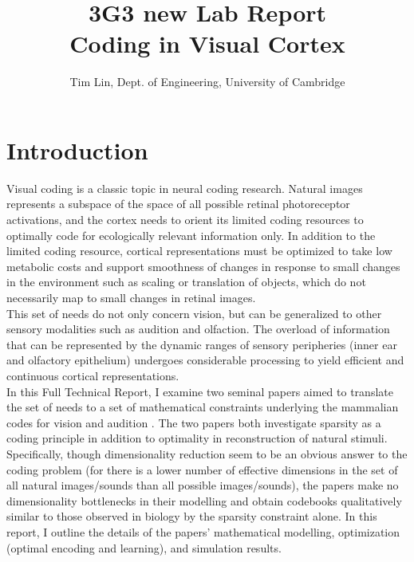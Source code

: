 \documentclass[
	a4paper, %
	11pt, %
	unnumberedsections, %
]{LTJournalArticle}
\title{3G3 new Lab Report\\Coding in Visual Cortex} %
\author{%
Tim Lin, Dept. of Engineering, University of Cambridge
}
\begin{document}
\maketitle %

\section{Introduction}
Visual coding is a classic topic in neural coding research. Natural images represents a subspace of the space of all possible retinal photoreceptor activations, and the cortex needs to orient its limited coding resources to optimally code for ecologically relevant information only. In addition to the limited coding resource, cortical representations must be optimized to take low metabolic costs and support smoothness of changes in response to small changes in the environment such as scaling or translation of objects, which do not necessarily map to small changes in retinal images. \\

This set of needs do not only concern vision, but can be generalized to other sensory modalities such as audition and olfaction. The overload of information that can be represented by the dynamic ranges of sensory peripheries (inner ear and olfactory epithelium) undergoes considerable processing to yield efficient and continuous cortical representations.\\

In this Full Technical Report, I examine two seminal papers aimed to translate the set of needs to a set of mathematical constraints underlying the mammalian codes for vision and audition \cite{olshausenSparseCodingOvercomplete1997, smithEfficientAuditoryCoding2006}. The two papers both investigate sparsity as a coding principle in addition to optimality in reconstruction of natural stimuli. Specifically, though dimensionality reduction seem to be an obvious answer to the coding problem (for there is a lower number of effective dimensions in the set of all natural images/sounds than all possible images/sounds), the papers make no dimensionality bottlenecks in their modelling and obtain codebooks qualitatively similar to those observed in biology by the sparsity constraint alone. In this report, I outline the details of the papers' mathematical modelling, optimization (optimal encoding and learning), and simulation results.
\end{document}
